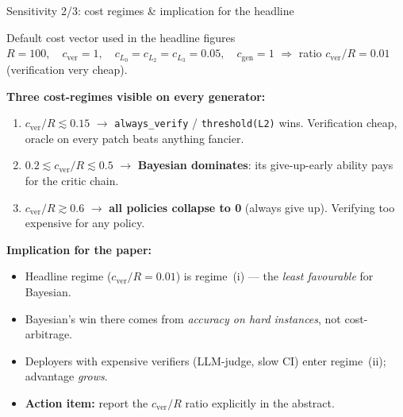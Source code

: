 \documentclass[10pt]{beamer}
\newcommand{\good}[1]{\textcolor{accentGreen}{\textbf{#1}}}
\newcommand{\bad}[1]{\textcolor{accentRed}{\textbf{#1}}}
\newcommand{\warn}[1]{\textcolor{accentOrange}{\textbf{#1}}}
\newcommand{\info}[1]{\textcolor{primaryBlue}{\textbf{#1}}}
\begin{document}
\begin{frame}{Sensitivity 2/3: cost regimes \& implication for the headline}
\vspace{0.1cm}
\begin{block}{Default cost vector used in the headline figures}
\small
$R = 100, \quad c_\text{ver} = 1, \quad c_{L_0} = c_{L_2} = c_{L_3} = 0.05,
\quad c_\text{gen} = 1$ \quad
$\Rightarrow$ ratio $c_\text{ver}/R = 0.01$ (verification very cheap).
\end{block}

\vspace{0.1cm}
\good{\textbf{Three cost-regimes visible on every generator:}}
\begin{enumerate}\setlength\itemsep{1pt}
\item \footnotesize $c_\text{ver}/R \lesssim 0.15$ $\to$
  \texttt{always\_verify} / \texttt{threshold(L2)} wins. Verification cheap,
  oracle on every patch beats anything fancier.
\item \footnotesize $0.2 \lesssim c_\text{ver}/R \lesssim 0.5$ $\to$
  \warn{Bayesian dominates}: its give-up-early ability pays for the critic chain.
\item \footnotesize $c_\text{ver}/R \gtrsim 0.6$ $\to$ \bad{all policies
  collapse to 0} (always give up). Verifying too expensive for any policy.
\end{enumerate}

\vspace{0.15cm}
\info{\textbf{Implication for the paper:}}
\begin{itemize}\setlength\itemsep{1pt}
\item \footnotesize Headline regime ($c_\text{ver}/R = 0.01$) is regime~(i) ---
  the \emph{least favourable} for Bayesian.
\item \footnotesize Bayesian's win there comes from \emph{accuracy on hard
  instances}, not cost-arbitrage.
\item \footnotesize Deployers with expensive verifiers (LLM-judge, slow CI)
  enter regime~(ii); advantage \emph{grows}.
\item \footnotesize \warn{Action item:} report the $c_\text{ver}/R$ ratio
  explicitly in the abstract.
\end{itemize}
\end{frame}
\end{document}
